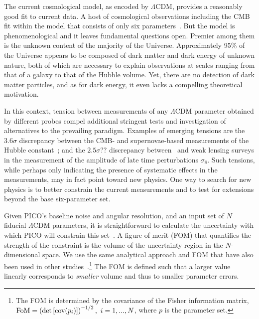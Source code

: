 \documentclass[PICOReport.tex]{subfiles}
\begin{document}

The current cosmological model, as encoded by $\Lambda$CDM, provides a reasonably good fit to current data. A host of cosmological observations including the CMB fit within the model that consists of only six parameters~\citep{Planck2018_I}. But the model is phenomenological and it leaves fundamental questions open. Premier among them is the unknown content of the majority of the Universe. Approximately 95\% of the Universe appears to be composed of dark matter and dark energy of unknown nature, both of which are necessary to explain observations at scales ranging from that of a galaxy to that of the Hubble volume. Yet, there are no detection of dark matter particles, and as for dark energy, it even lacks a compelling theoretical motivation.

In this context, tension between measurements of any $\Lambda$CDM parameter obtained by different probes compel additional stringent tests and investigation of alternatives to the prevailing paradigm. Examples of emerging tensions are the $3.6\sigma$ discrepancy between the CMB- and supernovae-based measurements of the Hubble constant~\citep{Aghanim:2018eyx,Riess2018}; and the $2.5\sigma ??$  discrepancy between \planck\ and weak lensing surveys in the  measurement of the amplitude of late time perturbations $\sigma_{8}$. Such tensions, while perhaps only indicating the presence of systematic effects in the measurements, may in fact point toward new physics. One way to search for new physics is to better constrain the current measurements and to test for extensions beyond the base six-parameter set. 

Given PICO's baseline noise and angular resolution, and an input set of $N$ fiducial $\Lambda$CDM parameters, it is straightforward to calculate the uncertainty with which PICO will constrain this set~\citep{core_parameter}. A figure of merit (FOM) that quantifies the strength of the constraint is the volume of the uncertainty region in the $N$-dimensional space. We use the same analytical approach and FOM that have also been used in other studies~\cite{core_parameter,Wang2008,pdg2018,Namikawa2010}.\footnote{The FOM is determined by the covariance of the Fisher information matrix, ${\rm FoM} = \left( \det \left[ \mbox{cov} ( p_i)  \right] \right)^{-1/2},\,\, i=1, ..., N$, where $p$ is the parameter set.} The FOM is defined such that a larger value linearly corresponds to {\it smaller} volume and thus to smaller parameter errors. 
\end{document}
